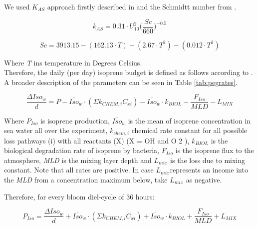 \documentclass[draft,linenumbers]{agujournal}
\begin{document}
We used $K_{AS}$ approach firstly described in \citep{palmer2005quantifying} and the Schmidtt number from \citep{wanninkhof1992relationship}.\\

\begin{linenomath*}
\begin{equation}
k_{AS} = 0.31 \cdot U_{10}^{2} \bigg(\frac{Sc}{660}\bigg)^{-0.5}
\end{equation}
\end{linenomath*}

\begin{linenomath*}
\begin{equation}
Sc = 3913.15 - (162.13 \cdot T) + (2.67 \cdot T^{2}) - (0.012 \cdot T^{3})
\end{equation}
\end{linenomath*}

Where \textit{T} ins temperature in Degrees Celsius.\\

Therefore, the daily (per day) isoprene budget is defined as follows according to \citep{booge2016can}. A broader description of the parameters can be seen in Table \ref{tab:pegrates}.\\

\begin{linenomath*}
\begin{equation}
\frac{ΔIso_{w}}{d} =  P - \overline{Iso}_{w} \cdot (Σ k_{CHEM, i} C_{xi}) - \overline{Iso}_{w}  \cdot k_{BIOL} - \frac{F_{Iso}}{MLD} - L_{MIX}
\end{equation}
\end{linenomath*}

Where $P_{Iso}$ is isoprene production, $\overline{Iso}_{w}$ is the mean of isoprene concentration in sea water all over the experiment, $k_{chem, i}$ chemical rate constant for all possible loss pathways (i) with all reactants (X) (X = OH and O 2 ), $k_{BIOL}$ is the biological degradation rate of isoprene by bacteria, $F_{Iso}$ is the isoprene flux to the atmosphere, \textit{MLD} is the mixing layer depth and $L_{mix}$ is the loss due to mixing constant. 
Note that all rates are positive. In case  $L_{mix}$represents an income into the \textit{MLD} from a concentration maximum below, take $L_{mix}$ as negative.

Therefore, for every bloom diel-cycle of 36 hours:\\

\begin{linenomath*}
\begin{equation}
P_{Iso} = \frac{ΔIso_{w}}{d} + \overline{Iso}_{w} \cdot (Σ k_{CHEM, i} C_{xi}) + \overline{Iso}_{w} \cdot k_{BIOL} + \frac{F_{Iso}}{MLD} + L_{MIX}
\end{equation}
\end{linenomath*}
\end{document}
